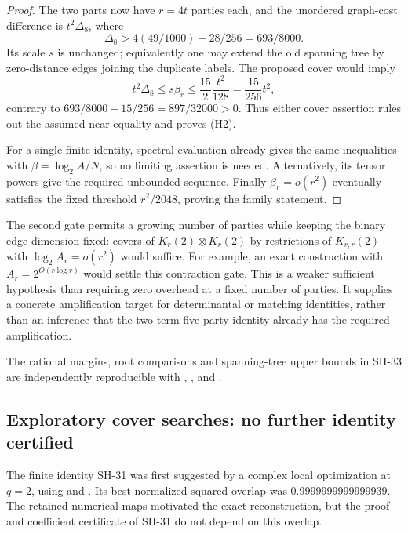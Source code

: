 \begin{proof}
The two parts now have $r=4t$ parties each, and the
unordered graph-cost difference is $t^2\Delta_8$, where
\[
 \Delta_8>4(49/1000)-28/256=693/8000.
\]
Its scale $s$ is unchanged; equivalently one may
extend the old spanning tree by zero-distance edges
joining the duplicate labels.  The proposed cover
would imply
\[
 t^2\Delta_8\le s\beta_r
 \le\frac{15}{2}\frac{t^2}{128}
 =\frac{15}{256}t^2,
\]
contrary to $693/8000-15/256=897/32000>0$.
Thus either cover assertion rules out the assumed
near-equality and proves (H2).

For a single finite identity, spectral evaluation
already gives the same inequalities with
$\beta=\log_2A/N$, so no limiting assertion is
needed.  Alternatively, its tensor powers give the
required unbounded sequence.  Finally
$\beta_r=o(r^2)$ eventually satisfies the fixed
threshold $r^2/2048$, proving the family statement.
\end{proof}

The second gate permits a growing number of parties
while keeping the binary edge dimension fixed: covers
of $K_r(2)\otimes K_r(2)$ by restrictions of
$K_{r,r}(2)$ with $\log_2 A_r=o(r^2)$ would suffice.
For example, an exact construction with
$A_r=2^{O(r\log r)}$ would settle this contraction
gate.  This is a weaker sufficient hypothesis than
requiring zero overhead at a fixed number of parties.
It supplies a concrete amplification target for
determinantal or matching identities, rather than
an inference that the two-term five-party identity
already has the required amplification.

The rational margins, root comparisons and spanning-tree
upper bounds in SH-33 are independently reproducible with
,
, and
.

\subsection{Exploratory cover searches: no further identity certified}

The finite identity SH-31 was first suggested by a complex
local optimization at $q=2$, using
 and
.
Its best normalized squared overlap was
$0.9999999999999939$.  The retained numerical maps motivated
the exact reconstruction, but the proof and coefficient
certificate of SH-31 do not depend on this overlap.

